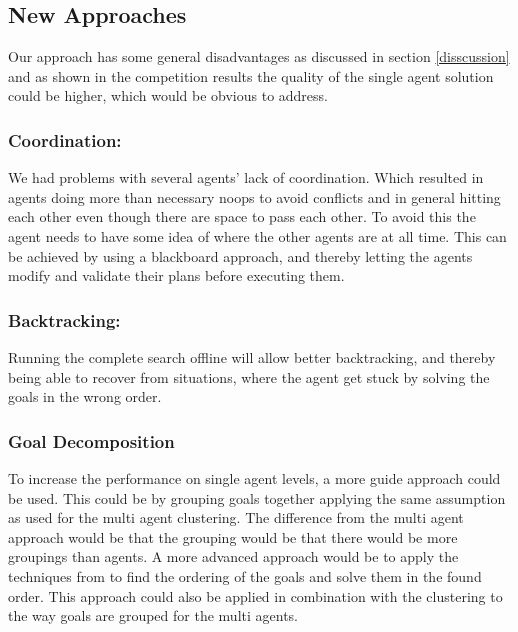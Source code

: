 \documentclass[letterpaper]{article}
\begin{document}
	\subsection{New Approaches}
		Our approach has some general disadvantages as discussed in section \ref{disscussion} and as shown in the competition results the quality of the single agent solution could be higher, which would be obvious to address.

		\subsubsection{Coordination:}
			We had problems with several agents' lack of coordination. Which resulted in agents doing more than necessary noops to avoid conflicts and in general hitting each other even though there are space to pass each other. To avoid this the agent needs to have some idea of where the other agents are at all time. This can be achieved by using a  blackboard approach, and thereby letting the agents modify and validate their plans before executing them.
		\subsubsection{Backtracking:}
		\label{subsub:backtrack}
			Running the complete search offline will allow better backtracking, and thereby being able to recover from situations, where the agent get stuck by solving the goals in the wrong order. 

		\subsubsection{Goal Decomposition}
			To increase the performance on single agent levels, a more guide approach could be used. This could be by grouping goals together applying the same assumption as used for the multi agent clustering. The difference from the multi agent approach would be that the grouping would be that there would be more groupings than agents. A more advanced approach would be to apply the techniques from \cite{Subgoals} to find the ordering of the goals and solve them in the found order. This approach could also be applied in combination with the clustering to the way goals are grouped for the multi agents.
			
\end{document}
